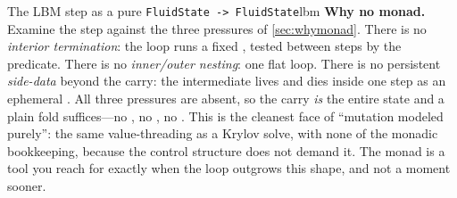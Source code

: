 \begin{workedexample}{The LBM step as a pure \texttt{FluidState -> FluidState}}{lbm}
\textbf{Why no monad.} Examine the step against the three pressures of
\cref{sec:whymonad}. There is no \emph{interior termination}: the loop runs a fixed
, tested between steps by the predicate. There is no \emph{inner/outer
nesting}: one flat loop. There is no persistent \emph{side-data} beyond the carry: the
 intermediate lives and dies inside one step as an ephemeral
. All three pressures are absent, so the carry \emph{is} the entire state
and a plain fold suffices---no , no , no .
This is the cleanest face of ``mutation modeled purely'': the same value-threading as
a Krylov solve, with none of the monadic bookkeeping, because the control structure
does not demand it. The monad is a tool you reach for exactly when the loop outgrows
this shape, and not a moment sooner.
\end{workedexample}

